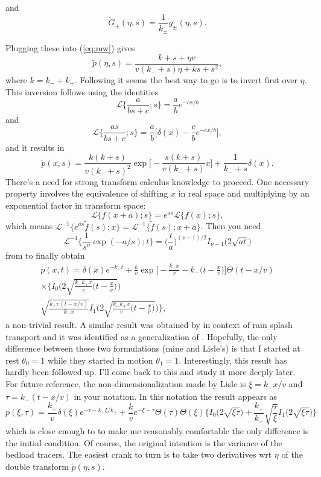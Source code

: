 \documentclass[11pt]{article}
\newcommand\be{\begin{equation}} %
\newcommand\ee{\end{equation}}   %
\newcommand\El{\mathcal{L}}
\newcommand\tg{\tilde{g}}
\newcommand\tG{\tilde{G}}
\begin{document}
and
\be \tG_\pm(\eta,s) = \frac{1}{k_\pm}\tg_\pm(\eta,s).\ee

Plugging these into (\ref{eq:mw}) gives
\be \tilde{p}(\eta,s) = \frac{k + s + \eta v }{v(k_-+s) \eta  + k s + s^2 },\ee
where $k = k_- + k_+$. Following \citet{Lisle1998}it seems the best way to go is to invert first over $\eta$.
This inversion follows using the identities
\be \El\Big\{\frac{a}{bs+c};s\Big\} = \frac{a}{b}e^{-cx/b}\ee
and
\be \El\Big\{\frac{as}{bs+c};s\Big\} = \frac{a}{b}\Big[\delta(x) - \frac{c}{b}e^{-cx/b}\Big],\ee
and it results in 
\be \tilde{p}(x,s) = \frac{k(k+s)}{v(k_-+s)^2} \exp\Big[-\frac{s(k+s)}{v(k_-+s)}x\Big] + \frac{1}{k_-+s}\delta(x) .\ee
There's a need for strong transform calculus knowledge to proceed.
One necessary property involves the equivalence of shifting $x$ in real space and multiplying by an exponential factor in transform space: 
\be \El\{f(x+a);s\} = e^{as}\El\{f(x);s\},\ee
which means $\El^{-1} \{e^{as}\tilde{f}(s);x\} = \El^{-1}\{\tilde{f}(s);x+a\}$.
Then you need 
\be \El^{-1}\big\{\frac{1}{s^\nu}\exp(-a/s);t\} = \Big(\frac{t}{a}\Big)^{(\nu-1)/2}I_{\nu-1}\big(2\sqrt{a t}\big) \ee
from \citet[][2.2.2.1]{Prudnikov1986} to finally obtain 
\begin{multline}
p(x,t) = \delta(x) e^{-k_- t} + \frac{k}{v}\exp\Big[-\frac{k_+x }{v} - k_-\Big(t-\frac{x}{v}\Big)\Big]\Theta(t-x/v)\\ 
 \times \Big\{ I_0\Big(2\sqrt{\frac{k_-k_+x}{v}\big(t-\frac{x}{v}\big)}\Big) \\
\sqrt{\frac{k_+ v(t-x/v)}{k_-x}}I_1\Big(2\sqrt{\frac{k_-k_+x}{v}\big(t-\frac{x}{v}\big)}\Big) 
\Big\},
\end{multline}
a non-trivial result. A similar result was obtained by \citet{Lisle1998} in context of rain splash transport and it was identified as a generalization of \citet{Einstein1937}. Hopefully, the only difference between these two formulations (mine and Lisle's) is that I started at rest $\theta_0=1$ while they started in motion $\theta_1=1$.
Interestingly, this result has hardly been followed up. 
I'll come back to this and study it more deeply later. 
For future reference, the non-dimensionalization made by Lisle is $\xi = k_+ x /v$ and $\tau = k_-(t-x/v)$ in your notation.
In this notation the result appears as
\be p(\xi,\tau) = \frac{k_+}{v}\delta(\xi)e^{-\tau-k_-\xi/k_+} +  \frac{k}{v}e^{-\xi-\tau}\Theta(\tau)\Theta(\xi)\Big\{I_0\big(2\sqrt{\xi \tau}\big) +\frac{k_+}{k_-}\sqrt{\frac{\tau}{\xi}}I_1\big(2\sqrt{\xi\tau}\big) \Big\}\ee
which is close enough to \citet{Lisle1998} to make me reasonably comfortable the only difference is the initial condition.
Of course, the original intention is the variance of the bedload tracers.
The easiest crank to turn is to take two derivatives wrt $\eta$ of the double transform $\tilde{p}(\eta,s).$
\end{document}
